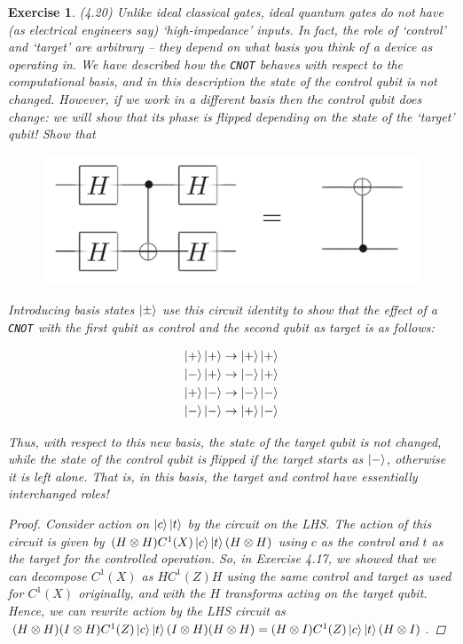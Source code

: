\documentclass[11pt]{article}
\newcommand\0{\mathbf{0}}
\newcommand\<{\langle}
\renewcommand\>{\rangle}
\newtheorem{exercise}[theorem]{Exercise}
\begin{document}
\begin{exercise}(4.20) Unlike ideal classical gates, ideal quantum gates do not have (as electrical engineers say) ‘high-impedance’ inputs. In fact, the role of ‘control’ and ‘target’ are arbitrary – they depend on what basis you think of a device as operating in. We have described how the \texttt{CNOT} behaves with respect to the computational basis, and in this description the state of the control qubit is not changed. However, if we work in a different basis then the control qubit does change: we will show that its phase is flipped depending on the state of the ‘target’ qubit! Show that

\begin{figure}[H]
\centering
\includegraphics[width=.5\linewidth]{4_20.png}
\end{figure}

Introducing basis states $\ket{\pm}$ use this circuit identity to show that the effect of a \texttt{CNOT} with the first qubit as control and the second qubit as target is as follows:


\begin{align*}
\ket{+}\ket{+} \rightarrow \ket{+}\ket{+} \\	
\ket{-}\ket{+} \rightarrow \ket{-}\ket{+} \\	
\ket{+}\ket{-} \rightarrow \ket{-}\ket{-} \\	
\ket{-}\ket{-} \rightarrow \ket{+}\ket{-} 
\end{align*}

Thus, with respect to this new basis, the state of the target qubit is not changed, while the state of the control qubit is flipped if the target starts as $\ket{-}$, otherwise it is left alone. That is, in this basis, the target and control have essentially interchanged roles!

\begin{proof}
Consider action on $\ket{c}\ket{t}$ by the circuit on the LHS. The action of this circuit is given by $(H \otimes H) C^1(X)\ket{c}\ket{t} (H \otimes H)$ using $c$ as the control and $t$ as the target for the controlled operation. So, in Exercise 4.17, we showed that we can decompose $C^1(X)$ as $HC^1(Z)H$ using the same control and target as used for $C^1(X)$ originally, and with the $H$ transforms acting on the target qubit. Hence, we can rewrite action by the LHS circuit as $(H \otimes H) (I \otimes H) C^1(Z)\ket{c}\ket{t} (I \otimes H) (H \otimes H) = (H \otimes I) C^1(Z)\ket{c}\ket{t} (H \otimes I)$.


\end{proof}
\end{exercise}
\end{document}
